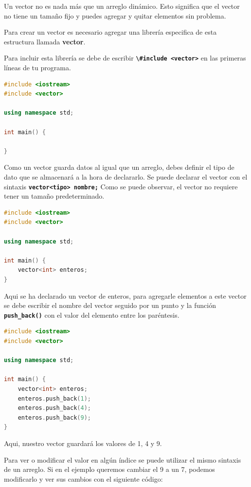 \documentclass{article}
\begin{document}
Un vector no es nada más que un arreglo dinámico. Esto significa que el vector no tiene un tamaño fijo y puedes agregar y quitar elementos sin problema.

Para crear un vector es necesario agregar una librería especifica de esta estructura llamada \textbf{vector}.

Para incluir esta librería se debe de escribir \textbf{\lstinline{\#include <vector>}} en las primeras líneas de tu programa.

\begin{lstlisting}[language=C++, caption=Vectores]
#include <iostream>
#include <vector>

using namespace std;

int main() {

}
\end{lstlisting}

Como un vector guarda datos al igual que un arreglo, debes definir el tipo de dato que se almacenará a la hora de declararlo. Se puede declarar el vector con el sintaxis \textbf{\lstinline{vector<tipo> nombre;}} Como se puede observar, el vector no requiere tener un tamaño predeterminado.

\begin{lstlisting}[language=C++, caption=Vectores]
#include <iostream>
#include <vector>

using namespace std;

int main() {
    vector<int> enteros;
}
\end{lstlisting}

Aqui se ha declarado un vector de enteros, para agregarle elementos a este vector se debe escribir el nombre del vector seguido por un punto y la función \textbf{\lstinline{push_back()}} con el valor del elemento entre los paréntesis.

\begin{lstlisting}[language=C++, caption=Agregando valores]
#include <iostream>
#include <vector>

using namespace std;

int main() {
    vector<int> enteros;
    enteros.push_back(1);
    enteros.push_back(4);
    enteros.push_back(9);
}
\end{lstlisting}

Aqui, nuestro vector guardará los valores de 1, 4 y 9.

Para ver o modificar el valor en algún índice se puede utilizar el mismo sintaxis de un arreglo. Si en el ejemplo queremos cambiar el 9 a un 7, podemos modificarlo y ver sus cambios con el siguiente código:
\end{document}
